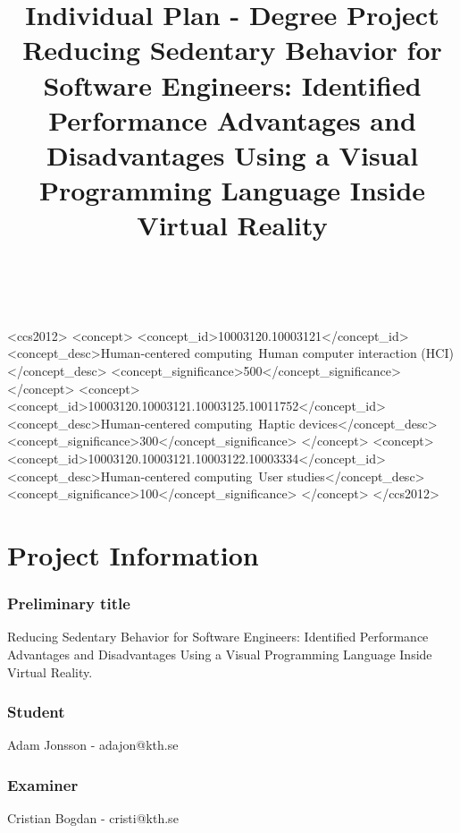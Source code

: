 \documentclass{sigchi}
\def\plaintitle{Individual Plan - Degree Project}
\def\subplaintitle{
  Reducing Sedentary Behavior for Software Engineers: Identified Performance Advantages and Disadvantages Using a Visual Programming Language Inside Virtual Reality}
\begin{document}
\title{%
  \plaintitle \\
  \large \subplaintitle
}

\author{
  \\
}

\maketitle



\begin{CCSXML}
<ccs2012>
<concept>
<concept_id>10003120.10003121</concept_id>
<concept_desc>Human-centered computing~Human computer interaction (HCI)</concept_desc>
<concept_significance>500</concept_significance>
</concept>
<concept>
<concept_id>10003120.10003121.10003125.10011752</concept_id>
<concept_desc>Human-centered computing~Haptic devices</concept_desc>
<concept_significance>300</concept_significance>
</concept>
<concept>
<concept_id>10003120.10003121.10003122.10003334</concept_id>
<concept_desc>Human-centered computing~User studies</concept_desc>
<concept_significance>100</concept_significance>
</concept>
</ccs2012>
\end{CCSXML}


\section{Project Information}

\subsubsection{Preliminary title}
\subplaintitle.

\subsubsection{Student} 
Adam Jonsson - adajon@kth.se

\subsubsection{Examiner} 
Cristian Bogdan - cristi@kth.se
\end{document}
